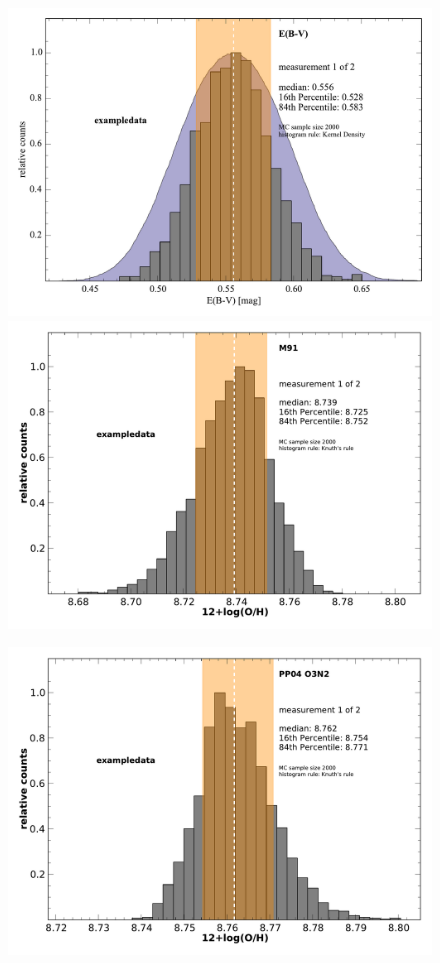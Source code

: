 \documentclass{emulateapj}
\begin{document}
\begin{figure}[!HT]
\begin{center}
\centerline{
\includegraphics[width=0.95\columnwidth]{exampledata_n2000_E(B-V)_1.pdf}
\includegraphics[width=0.95\columnwidth]{exampledata_n2000_M91_1.pdf}}
\vspace{0.2in}
\centerline{
\includegraphics[width=0.95\columnwidth]{exampledata_n2000_PP04_O3N2_1.pdf}
}
\end{center}
\end{figure}
\end{document}
